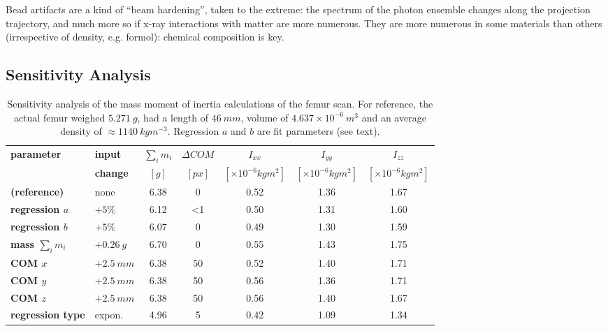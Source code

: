 Bead artifacts are a kind of ``beam hardening'', taken to the extreme: the spectrum of the photon ensemble changes along the projection trajectory, and much more so if x-ray interactions with matter are more numerous.
They are more numerous in some materials than others (irrespective of density, e.g. formol): chemical composition is key.


\subsection{Sensitivity Analysis}
\label{sec:org8f04e5e}

\begin{table}[p]
\caption{\label{tab:sensitivity}Sensitivity analysis of the mass moment of inertia calculations of the femur scan. For reference, the actual femur weighed \(5.271\ g\), had a length of \(46\ mm\), volume of \(4.637\times 10^{-6}\ m^{3}\) and an average density of \(\approx 1140\ kg m^{-3}\). Regression \(a\) and \(b\) are fit parameters (see text).}
\centering
\begin{tabular}{|l|l|c|c|c|c|c|}
\hline
\textbf{parameter} & \textbf{input} & \textbf{\(\sum_{i}m_{i}\)} & \textbf{\(\Delta COM\)} & \textbf{\(I_{xx}\)} & \textbf{\(I_{yy}\)} & \textbf{\(I_{zz}\)}\\[0pt]
 & \textbf{change} & \([g]\) & \([px]\) & \([\times 10^{-6} kg m^2]\) & \([\times 10^{-6} kg m^2]\) & \([\times 10^{-6} kg m^2]\)\\[0pt]
\hline
\hline
\textbf{(reference)} & none & 6.38 & 0 & 0.52 & 1.36 & 1.67\\[0pt]
\hline
\textbf{regression \(a\)} & \(+5 \%\) & 6.12 & <1 & 0.50 & 1.31 & 1.60\\[0pt]
\textbf{regression \(b\)} & \(+5 \%\) & 6.07 & 0 & 0.49 & 1.30 & 1.59\\[0pt]
\hline
\textbf{mass \(\sum_{i} m_{i}\)} & \(+0.26\ g\) & 6.70 & 0 & 0.55 & 1.43 & 1.75\\[0pt]
\hline
\textbf{COM \(x\)} & \(+2.5\ mm\) & 6.38 & 50 & 0.52 & 1.40 & 1.71\\[0pt]
\textbf{COM \(y\)} & \(+2.5\ mm\) & 6.38 & 50 & 0.56 & 1.36 & 1.71\\[0pt]
\textbf{COM \(z\)} & \(+2.5\ mm\) & 6.38 & 50 & 0.56 & 1.40 & 1.67\\[0pt]
\hline
\textbf{regression type} & expon. & 4.96 & 5 & 0.42 & 1.09 & 1.34\\[0pt]
\hline
\hline
\end{tabular}
\end{table}


